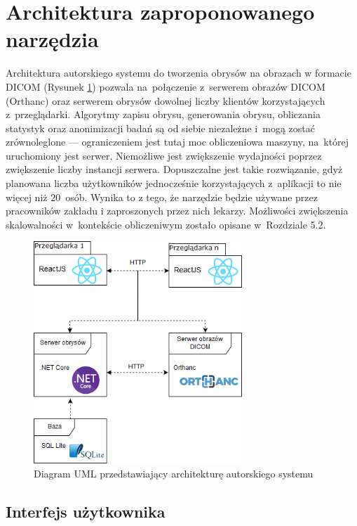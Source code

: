 \documentclass[a4paper,11pt,twoside,openright]{report}
\theoremstyle{definition}
\begin{document}
\section {Architektura zaproponowanego narzędzia}

Architektura autorskiego systemu do tworzenia obrysów na obrazach w formacie DICOM
(Rysunek \ref{fig:architektura}) pozwala na~połączenie z~serwerem obrazów DICOM (Orthanc) oraz serwerem
obrysów dowolnej liczby klientów korzystających z~przeglądarki. Algorytmy zapisu
obrysu, generowania obrysu, obliczania statystyk oraz anonimizacji badań są od
siebie niezależne i~mogą zostać zrównoleglone --- ograniczeniem jest tutaj moc
obliczeniowa maszyny, na~której uruchomiony jest serwer. Niemożliwe jest zwiększenie
wydajności poprzez zwiększenie liczby instancji serwera. Dopuszczalne jest takie
rozwiązanie, gdyż planowana liczba użytkowników jednocześnie korzystających z~aplikacji
to nie więcej niż 20~osób. Wynika to z tego, że narzędzie będzie używane przez pracowników
zakładu i zaproszonych przez nich lekarzy. Możliwości zwiększenia skalowalności w~kontekście
obliczeniwym zostało opisane w~Rozdziale 5.2.

\begin{figure}[t]
	\center
	\includegraphics[width=0.7\textwidth]{architektura}
	\caption{Diagram UML przedstawiający architekturę autorskiego systemu}
    	\label{fig:architektura}
\end{figure}

\subsection {Interfejs użytkownika}
\end{document}
